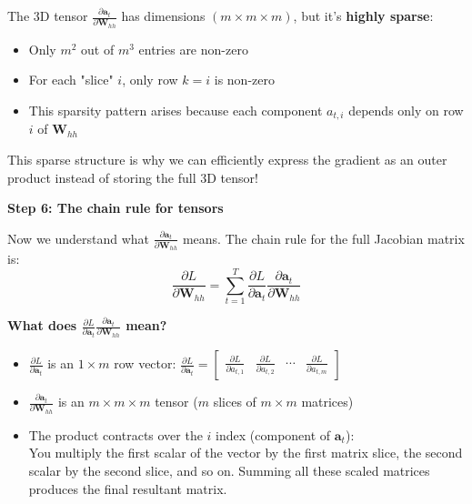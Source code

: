 \begin{notechapter}
\begin{keyinsight}[title=Understanding the Tensor Structure]
The 3D tensor $\frac{\partial \mathbf{a}_t}{\partial \mathbf{W}_{hh}}$
has dimensions $(m \times m \times m)$, but it's \textbf{highly sparse}:
\begin{itemize}[itemsep=0pt]
    \item Only $m^2$ out of $m^3$ entries are non-zero
    \item For each "slice" $i$, only row $k=i$ is non-zero
    \item This sparsity pattern arises because each component $a_{t,i}$
    depends only on row $i$ of $\mathbf{W}_{hh}$
\end{itemize}
This sparse structure is why we can efficiently express the gradient as
an outer product instead of storing the full 3D tensor!
\end{keyinsight}

\vspace{1em}
\textbf{Step 6: The chain rule for tensors}
\vspace{1em}

Now we understand what $\frac{\partial \mathbf{a}_t}{\partial \mathbf{W}_{hh}}$
means.
The chain rule for the full Jacobian matrix is:
\[
\frac{\partial L}{\partial \mathbf{W}_{hh}} =
\sum_{t=1}^{T} \frac{\partial L}{\partial \mathbf{a}_t} \frac{\partial \mathbf{a}_t}{\partial \mathbf{W}_{hh}}
\tag{W.4}
\]

\textbf{What does $\frac{\partial L}{\partial \mathbf{a}_t} \frac{\partial
\mathbf{a}_t}
{\partial \mathbf{W}_{hh}}$ mean?}
\begin{itemize}
    \item $\frac{\partial L}{\partial \mathbf{a}_t}$ is an $1 \times m$ row vector:
    $
        \frac{\partial L}{\partial \mathbf{a}_t} = 
        \begin{bmatrix}
            \frac{\partial L}{\partial a_{t,1}} & 
            \frac{\partial L}{\partial a_{t,2}} &
            \cdots &
            \frac{\partial L}{\partial a_{t,m}}
        \end{bmatrix}
    $
    \item $\frac{\partial \mathbf{a}_t}{\partial \mathbf{W}_{hh}}$ is an
    $m \times m \times m$ tensor ($m$ slices of $m \times m$ matrices)
    \item The product contracts over the $i$ index (component of $\mathbf{a}_t$):\\
    You multiply the first scalar of the vector by the first matrix slice,
    the second scalar by the second slice, and so on.
    Summing all these scaled matrices produces the final resultant matrix.
\end{itemize}


\end{notechapter}
